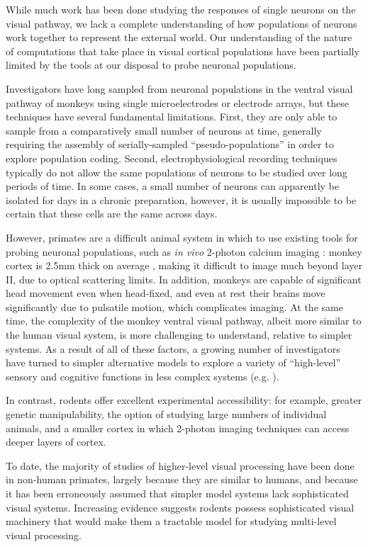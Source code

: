  While much work has been done studying the responses of single neurons on the visual pathway, we lack a complete understanding of how populations of neurons work together to represent the external world. Our understanding of the nature of computations that take place in visual cortical populations have been partially limited by the tools at our disposal to probe neuronal populations.   
 
 Investigators have long sampled from neuronal populations in the ventral visual pathway of monkeys using single microelectrodes or electrode arrays, but these techniques have several fundamental limitations. First, they are only able to sample from a comparatively small number of neurons at time, generally requiring the assembly of serially-sampled ``pseudo-populations'' in order to explore population coding. Second, electrophysiological recording techniques typically do not allow the same populations of neurons to be studied over long periods of time. In some cases, a small number of neurons can apparently be isolated for days in a chronic preparation, however, it is usually impossible to be certain that these cells are the same across days.

However, primates are a difficult animal system in which to use existing tools for probing neuronal populations, such as \textit{in vivo} 2-photon calcium imaging \cite{Ohki2005}: monkey cortex is 2.5mm thick on average \cite{Koo:2012aa}, making it difficult to image much beyond layer II, due to optical scattering limits. In addition, monkeys are capable of significant head movement even when head-fixed, and even at rest their brains move significantly due to pulsatile motion, which complicates imaging. At the same time, the complexity of the monkey ventral visual pathway, albeit more similar to the human visual system, is more challenging to understand, relative to simpler systems. As a result of all of these factors, a growing number of investigators have turned to simpler alternative models to explore a variety of ``high-level'' sensory and cognitive functions in less complex systems (e.g. \cite{kepecs2008neural, zeeb2009serotonergic}).

In contrast, rodents offer excellent experimental accessibility: for example, greater genetic manipulability, the option of studying large numbers of individual animals, and a smaller cortex in which 2-photon imaging techniques can access deeper layers of cortex. 

To date, the majority of studies of higher-level visual processing have been done in non-human primates, largely because they are similar to humans, and because it has been erroneously assumed that simpler model systems lack sophisticated visual systems. Increasing evidence suggests rodents possess sophisticated visual machinery that would make them a tractable model for studying multi-level visual processing.

